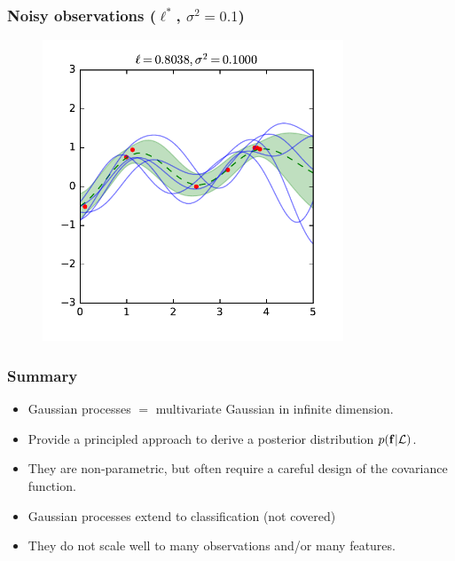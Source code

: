 \documentclass{beamer}
\begin{document}
\begin{frame}
    \frametitle{Noisy observations ($\ell^*$, $\sigma^2=0.1$)}

    \begin{figure}
        \centering
        \includegraphics[width=0.8\textwidth]{./figures/rbf-noise.pdf}
    \end{figure}
\end{frame}


\begin{frame}
    \frametitle{Summary}

    \begin{itemize}
        \item Gaussian processes $=$ multivariate Gaussian in infinite dimension.
        \item Provide a principled approach to derive a posterior distribution $p(\mathbf{f}|{\cal L})$.
        \item They are non-parametric, but often require a careful design of the covariance function.
        \item Gaussian processes extend to classification (not covered)
        \item They do not scale well to many observations and/or many features.
    \end{itemize}
\end{frame}
\end{document}
